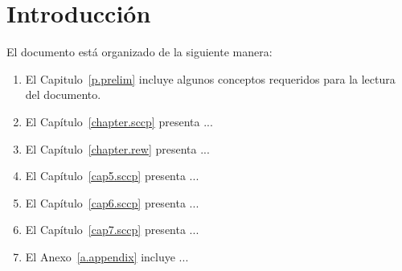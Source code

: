 \chapter{Introducci\'on}
\label{cha.intro}

El documento est\'a organizado de la siguiente manera:

\begin{enumerate}
   \item El Capitulo~\ref{p.prelim} incluye algunos conceptos requeridos
	para la lectura del documento.

   \item El Cap\'itulo~\ref{chapter.sccp} presenta ...
   \item El Cap\'itulo~\ref{chapter.rew} presenta ...
   \item El Cap\'itulo~\ref{cap5.sccp} presenta ...
   \item El Cap\'itulo~\ref{cap6.sccp} presenta ...
   \item El Cap\'itulo~\ref{cap7.sccp} presenta ...

   \item El Anexo~\ref{a.appendix} incluye ...
\end{enumerate}

